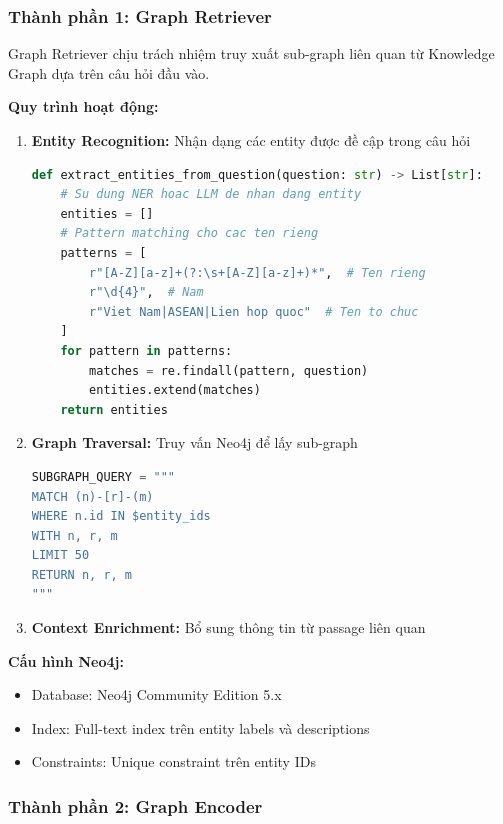 \subsubsection{Thành phần 1: Graph Retriever}

Graph Retriever chịu trách nhiệm truy xuất sub-graph liên quan từ Knowledge Graph dựa trên câu hỏi đầu vào.

\textbf{Quy trình hoạt động:}
\begin{enumerate}
    \item \textbf{Entity Recognition:} Nhận dạng các entity được đề cập trong câu hỏi
    \begin{lstlisting}[language=Python, caption={Entity extraction từ câu hỏi}]
def extract_entities_from_question(question: str) -> List[str]:
    # Su dung NER hoac LLM de nhan dang entity
    entities = []
    # Pattern matching cho cac ten rieng
    patterns = [
        r"[A-Z][a-z]+(?:\s+[A-Z][a-z]+)*",  # Ten rieng
        r"\d{4}",  # Nam
        r"Viet Nam|ASEAN|Lien hop quoc"  # Ten to chuc
    ]
    for pattern in patterns:
        matches = re.findall(pattern, question)
        entities.extend(matches)
    return entities
    \end{lstlisting}
    
    \item \textbf{Graph Traversal:} Truy vấn Neo4j để lấy sub-graph
    \begin{lstlisting}[language=Python, caption={Cypher query cho sub-graph retrieval}]
SUBGRAPH_QUERY = """
MATCH (n)-[r]-(m)
WHERE n.id IN $entity_ids
WITH n, r, m
LIMIT 50
RETURN n, r, m
"""
    \end{lstlisting}
    
    \item \textbf{Context Enrichment:} Bổ sung thông tin từ passage liên quan
\end{enumerate}

\textbf{Cấu hình Neo4j:}
\begin{itemize}
    \item Database: Neo4j Community Edition 5.x
    \item Index: Full-text index trên entity labels và descriptions
    \item Constraints: Unique constraint trên entity IDs
\end{itemize}

\subsubsection{Thành phần 2: Graph Encoder}

